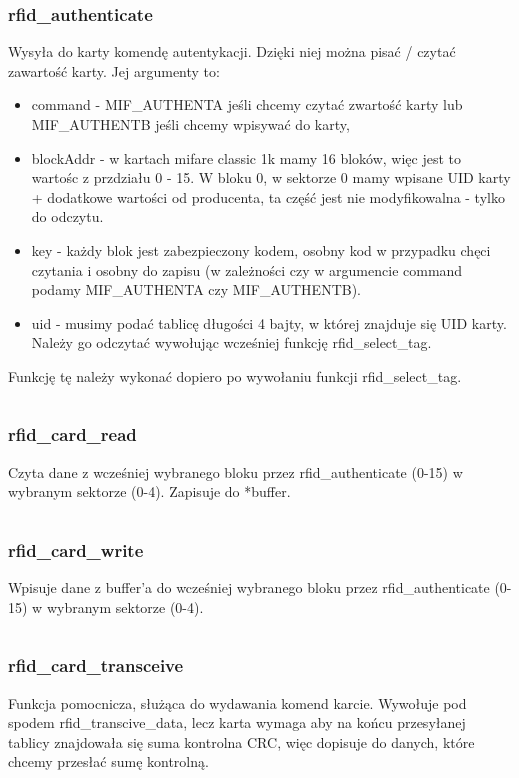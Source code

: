 \documentclass[12pt,hidelinks]{article}
\begin{document}
    \subsubsection{rfid\_authenticate}
    Wysyła do karty komendę autentykacji. Dzięki niej można pisać / czytać zawartość karty. Jej argumenty to:
    \begin{itemize}
        \item command - MIF\_AUTHENTA jeśli chcemy czytać zwartość karty lub MIF\_AUTHENTB jeśli chcemy wpisywać do karty,
        \item blockAddr - w kartach mifare classic 1k mamy 16 bloków, więc jest to wartośc z przdziału 0 - 15. W bloku 0, w sektorze 0 mamy wpisane UID karty + dodatkowe wartości od producenta, ta część jest nie modyfikowalna - tylko do odczytu.
        \item key - każdy blok jest zabezpieczony kodem, osobny kod w przypadku chęci czytania i osobny do zapisu (w zależności czy w argumencie command podamy MIF\_AUTHENTA czy MIF\_AUTHENTB).
        \item uid - musimy podać tablicę długości 4 bajty, w której znajduje się UID karty. Należy go odczytać wywołując wcześniej funkcję rfid\_select\_tag.
    \end{itemize}
    Funkcję tę należy wykonać dopiero po wywołaniu funkcji rfid\_select\_tag.
    \inputminted[linenos=true]{c++}{rfid_code/rfid_authenticate.c}


    \subsubsection{rfid\_card\_read}
    Czyta dane z wcześniej wybranego bloku przez rfid\_authenticate (0-15) w wybranym sektorze (0-4). Zapisuje do *buffer.
    \inputminted[linenos=true]{c++}{rfid_code/rfid_card_read.c}

    \subsubsection{rfid\_card\_write}
    Wpisuje dane z buffer'a do wcześniej wybranego bloku przez rfid\_authenticate (0-15) w wybranym sektorze (0-4).
    \inputminted[linenos=true]{c++}{rfid_code/rfid_card_write.c}

    \subsubsection{rfid\_card\_transceive}
    Funkcja pomocnicza, służąca do wydawania komend karcie. Wywołuje pod spodem rfid\_transcive\_data, lecz karta wymaga aby na końcu przesyłanej tablicy znajdowała się suma kontrolna CRC, więc dopisuje do danych, które chcemy przesłać sumę kontrolną.
    \inputminted[linenos=true]{c++}{rfid_code/rfid_card_transceive.c}
\end{document}
